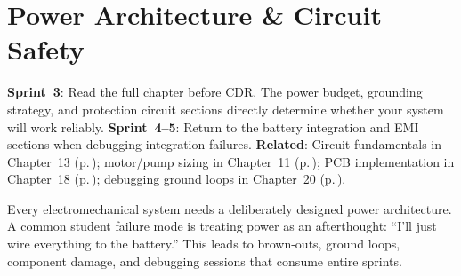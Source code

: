 \documentclass[11pt,letterpaper,twoside,openany]{book}
\begin{document}

\chapter{Power Architecture \& Circuit Safety}\label{ch:power}

\begin{tipbox}
\textbf{Sprint~3}: Read the full chapter before CDR. The power budget, grounding strategy, and protection circuit sections directly determine whether your system will work reliably. \textbf{Sprint~4--5}: Return to the battery integration and EMI sections when debugging integration failures. \textbf{Related}: Circuit fundamentals in Chapter~13 (p.\,\pageref{ch:electronics}); motor/pump sizing in Chapter~11 (p.\,\pageref{ch:motors}); PCB implementation in Chapter~18 (p.\,\pageref{ch:pcb}); debugging ground loops in Chapter~20 (p.\,\pageref{ch:debug}).
\end{tipbox}

\vspace{1em}

Every electromechanical system needs a deliberately designed power architecture. A common student failure mode is treating power as an afterthought: ``I'll just wire everything to the battery.'' This leads to brown-outs, ground loops, component damage, and debugging sessions that consume entire sprints.
\end{document}
